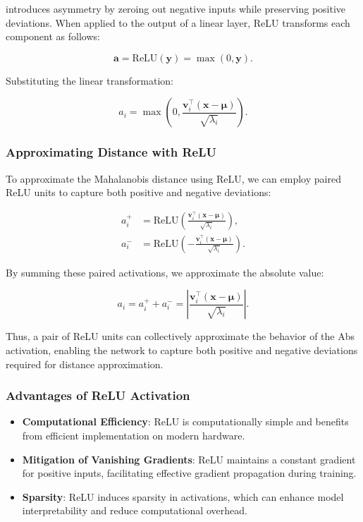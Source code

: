 introduces asymmetry by zeroing out negative inputs while preserving positive deviations. When applied to the output of a linear layer, ReLU transforms each component as follows:

\begin{equation}
\mathbf{a} = \text{ReLU}(\mathbf{y}) = \max(0, \mathbf{y}).
\end{equation}

Substituting the linear transformation:

\begin{equation}
a_i = \max\left(0, \frac{\mathbf{v}_i^\top (\mathbf{x} - \boldsymbol{\mu})}{\sqrt{\lambda_i}} \right).
\end{equation}

\subsubsection{Approximating Distance with ReLU}

To approximate the Mahalanobis distance using ReLU, we can employ paired ReLU units to capture both positive and negative deviations:

\begin{align}
a_i^+ &= \text{ReLU}\left( \frac{\mathbf{v}_i^\top (\mathbf{x} - \boldsymbol{\mu})}{\sqrt{\lambda_i}} \right), \\
a_i^- &= \text{ReLU}\left( -\frac{\mathbf{v}_i^\top (\mathbf{x} - \boldsymbol{\mu})}{\sqrt{\lambda_i}} \right).
\end{align}

By summing these paired activations, we approximate the absolute value:

\begin{equation}
a_i = a_i^+ + a_i^- = \left| \frac{\mathbf{v}_i^\top (\mathbf{x} - \boldsymbol{\mu})}{\sqrt{\lambda_i}} \right|.
\end{equation}

Thus, a pair of ReLU units can collectively approximate the behavior of the Abs activation, enabling the network to capture both positive and negative deviations required for distance approximation.

\subsubsection{Advantages of ReLU Activation}

\begin{itemize}
    \item \textbf{Computational Efficiency}: ReLU is computationally simple and benefits from efficient implementation on modern hardware.
    \item \textbf{Mitigation of Vanishing Gradients}: ReLU maintains a constant gradient for positive inputs, facilitating effective gradient propagation during training.
    \item \textbf{Sparsity}: ReLU induces sparsity in activations, which can enhance model interpretability and reduce computational overhead.
\end{itemize}

